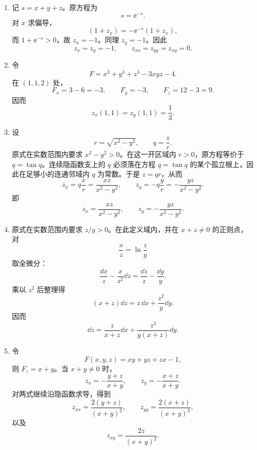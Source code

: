 \begin{xsolution}
\begin{enumerate}[label=(\arabic*)]
  \item 记 $s=x+y+z$。原方程为
  \[
    s=\ee^{-s}.
  \]
  对 $x$ 求偏导，
  \[
    (1+z_x)=-\ee^{-s}(1+z_x),
  \]
  而 $1+\ee^{-s}>0$，故 $z_x=-1$。同理 $z_y=-1$。因此
  \[
    \boxed{z_x=z_y=-1,\qquad z_{xx}=z_{yy}=z_{xy}=0}.
  \]

  \item 令
  \[
    F=x^3+y^3+z^3-3xyz-4.
  \]
  在 $(1,1,2)$ 处，
  \[
    F_x=3-6=-3,\qquad F_y=-3,
    \qquad F_z=12-3=9.
  \]
  因而
  \[
    \boxed{z_x(1,1)=z_y(1,1)=\frac13}.
  \]

  \item 设
  \[
    r=\sqrt{x^2-y^2},\qquad q=\frac zr.
  \]
  原式在实数范围内要求 $x^2-y^2>0$。在这一开区域内 $r>0$，原方程等价于 $q=\tan q$。连续隐函数支上的 $q$ 必须落在方程 $q=\tan q$ 的某个孤立根上，因此在足够小的连通邻域内 $q$ 为常数。于是 $z=qr$，从而
  \[
    z_x=q\frac xr=\frac{xz}{x^2-y^2},
    \qquad
    z_y=-q\frac yr=-\frac{yz}{x^2-y^2}.
  \]
  即
  \[
    \boxed{\displaystyle
      z_x=\frac{xz}{x^2-y^2},\qquad
      z_y=-\frac{yz}{x^2-y^2}}.
  \]

  \item 原式在实数范围内要求 $z/y>0$。在此定义域内，并在 $x+z\ne0$ 的正则点，对
  \[
    \frac xz=\ln\frac zy
  \]
  取全微分：
  \[
    \frac{\dd x}{z}-\frac{x}{z^2}\dd z
    =\frac{\dd z}{z}-\frac{\dd y}{y}.
  \]
  乘以 $z^2$ 后整理得
  \[
    (x+z)\dd z=z\,\dd x+\frac{z^2}{y}\dd y.
  \]
  因而
  \[
    \boxed{\displaystyle
      \dd z=\frac{z}{x+z}\dd x
      +\frac{z^2}{y(x+z)}\dd y}.
  \]

  \item 令
  \[
    F(x,y,z)=xy+yz+zx-1,
  \]
  则 $F_z=x+y$。当 $x+y\ne0$ 时，
  \[
    z_x=-\frac{y+z}{x+y},
    \qquad
    z_y=-\frac{x+z}{x+y}.
  \]
  对两式继续沿隐函数求导，得到
  \[
    \boxed{\displaystyle
      z_{xx}=\frac{2(y+z)}{(x+y)^2}},
    \qquad
    \boxed{\displaystyle
      z_{yy}=\frac{2(x+z)}{(x+y)^2}},
  \]
  以及
  \[
    \boxed{\displaystyle
      z_{xy}=\frac{2z}{(x+y)^2}}.
  \]
\end{enumerate}
\end{xsolution}



